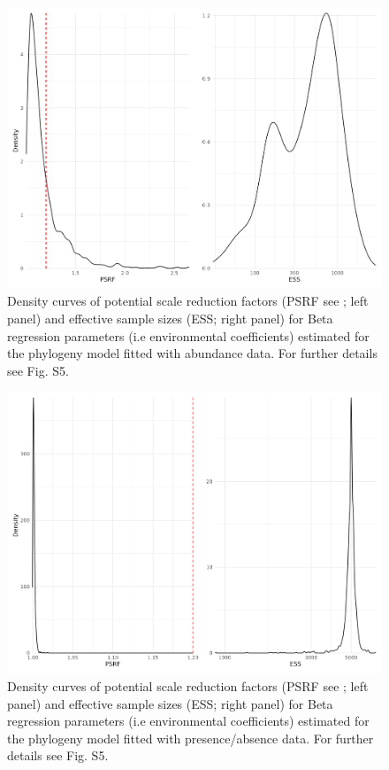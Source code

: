 \begin{figure}
\hypertarget{fig:chapt1phylo_ab_beta}{%
\centering
\includegraphics{03-Chapitre1/figures/supplementary/fig_supp_conv_beta_PolychaetaPhylogenyAB.png}
\caption{Density curves of potential scale reduction factors (PSRF see
\textcite{Brooks_1998}; left panel) and effective sample sizes (ESS;
right panel) for Beta regression parameters (i.e environmental
coefficients) estimated for the phylogeny model fitted with abundance
data. For further details see Fig. S5.}\label{fig:chapt1phylo_ab_beta}
}
\end{figure}

\begin{figure}
\hypertarget{fig:chapt1phylo_pa_beta}{%
\centering
\includegraphics{03-Chapitre1/figures/supplementary/fig_supp_conv_beta_PolychaetaPhylogenyPA.png}
\caption{Density curves of potential scale reduction factors (PSRF see
\textcite{Brooks_1998}; left panel) and effective sample sizes (ESS;
right panel) for Beta regression parameters (i.e environmental
coefficients) estimated for the phylogeny model fitted with
presence/absence data. For further details see Fig.
S5.}\label{fig:chapt1phylo_pa_beta}
}
\end{figure}

